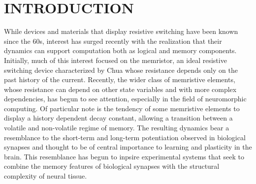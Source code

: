 \documentclass[aps,prl,preprint,groupedaddress]{revtex4-1}
\begin{document}
\pacs{}

\maketitle


\section{INTRODUCTION}

While devices and materials that display resistive switching have been known
since the 60s, interest has surged recently with the realization that their
dynamics can support computation both as logical and memory components.
Initially, much of this interest focused on the memristor, an ideal
resistive switching device characterized by Chua whose resistance depends
only on the past
history of the current.  Recently, the wider class of memristive elements, whose
resistance can depend on other state variables and with more complex
dependencies, has begun to see attention, especially in the field of
neuromorphic computing.  Of particular note is the tendency of some memristive
elements to display a history dependent decay constant, allowing a transition
between a volatile and non-volatile regime of memory.  The resulting dynamics
bear a resemblance to the short-term and long-term potentiation observed in
biological synapses and thought to be of central importance to learning and
plasticity in the brain.  This resemblance has begun to inpsire experimental
systems that seek to combine the memory features of biological synapses with
the structural complexity of neural tissue.
\end{document}
